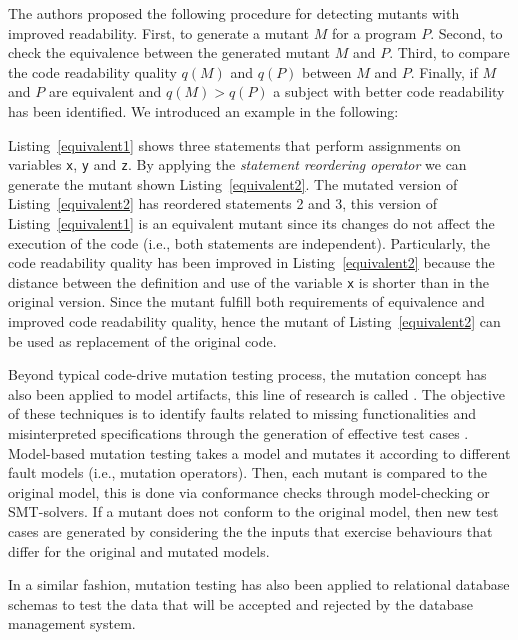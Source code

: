 The authors proposed the following procedure for detecting mutants with improved readability. 
First, to generate a mutant $M$ for a program $P$. Second, to check the equivalence between the generated mutant $M$ and $P$. Third, to compare the code readability quality $q(M)$ and $q(P)$ between $M$ and $P$. Finally, if $M$ and $P$ are equivalent and $q(M) > q(P)$ a subject with better code readability has been identified. We introduced an example in the following:



Listing~\ref{equivalent1} shows three statements that perform assignments on variables \texttt{x}, \texttt{y} and \texttt{z}. By applying the \textit{statement reordering operator} we can generate the mutant shown Listing~\ref{equivalent2}. The mutated version of Listing~\ref{equivalent2} has reordered statements 2 and 3, this version of Listing~\ref{equivalent1} is an equivalent mutant since its changes do not affect the execution of the code (i.e., both statements are independent). 
Particularly, the code readability quality has been improved in Listing~\ref{equivalent2} because the distance between the definition and use of the variable \texttt{x} is shorter than in the original version. 
Since the mutant fulfill both requirements of equivalence and improved code readability quality, hence the mutant of Listing~\ref{equivalent2} can be used as replacement of the original code.


Beyond typical code-drive mutation testing process, the mutation concept has also been applied to model artifacts, this line of research is called . The objective of these techniques is to identify faults related to missing functionalities and misinterpreted specifications through the generation of effective test cases \cite{devroey2016featured,belli2016model}.
Model-based mutation testing takes a model and mutates it according to different fault models (i.e., mutation operators). Then, each mutant is compared to the original model, this is done via conformance checks through model-checking or SMT-solvers. If a mutant does not conform to the original model, then new test cases are generated by considering the the inputs that exercise behaviours that differ for the original and mutated models\cite{8411732}.

In a similar fashion, mutation testing has also been applied to relational database schemas \cite{wright2013efficient} to test the data that will be accepted and rejected by the database management system.

